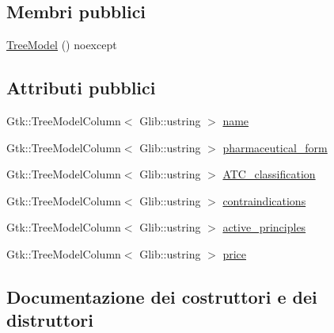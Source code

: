 \subsection*{Membri pubblici}
\begin{DoxyCompactItemize}
\item 
\mbox{\hyperlink{structmm_1_1model_1_1_drug_1_1_tree_model_ae0aec47ef95a2143bea49ed0058d5778}{Tree\+Model}} () noexcept
\end{DoxyCompactItemize}
\subsection*{Attributi pubblici}
\begin{DoxyCompactItemize}
\item 
Gtk\+::\+Tree\+Model\+Column$<$ Glib\+::ustring $>$ \mbox{\hyperlink{structmm_1_1model_1_1_drug_1_1_tree_model_a21ecd0c62d35f3a4f2e16253d5faa09c}{name}}
\item 
Gtk\+::\+Tree\+Model\+Column$<$ Glib\+::ustring $>$ \mbox{\hyperlink{structmm_1_1model_1_1_drug_1_1_tree_model_a29443772824bbfc47d5c61e5e5c46050}{pharmaceutical\+\_\+form}}
\item 
Gtk\+::\+Tree\+Model\+Column$<$ Glib\+::ustring $>$ \mbox{\hyperlink{structmm_1_1model_1_1_drug_1_1_tree_model_abdc7bfea0985a9082361575803b78d0e}{A\+T\+C\+\_\+classification}}
\item 
Gtk\+::\+Tree\+Model\+Column$<$ Glib\+::ustring $>$ \mbox{\hyperlink{structmm_1_1model_1_1_drug_1_1_tree_model_a975dd1b785590092258796e842cd5bf5}{contraindications}}
\item 
Gtk\+::\+Tree\+Model\+Column$<$ Glib\+::ustring $>$ \mbox{\hyperlink{structmm_1_1model_1_1_drug_1_1_tree_model_a0ad53d6e45f9001d07e350ab7866f1da}{active\+\_\+principles}}
\item 
Gtk\+::\+Tree\+Model\+Column$<$ Glib\+::ustring $>$ \mbox{\hyperlink{structmm_1_1model_1_1_drug_1_1_tree_model_a89b06b1ccb81a349452bdb9273867269}{price}}
\end{DoxyCompactItemize}


\subsection{Documentazione dei costruttori e dei distruttori}
\mbox{\label{structmm_1_1model_1_1_drug_1_1_tree_model_ae0aec47ef95a2143bea49ed0058d5778}} 
